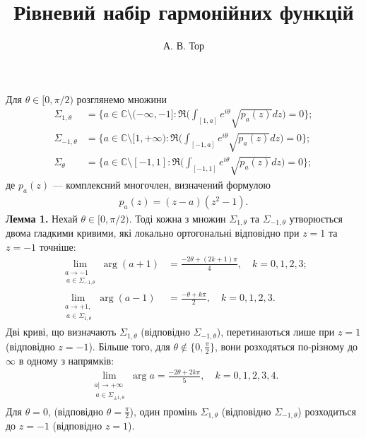 \documentclass{article}
\title{\sffamily Рівневий набір гармонійних функцій}
\author{А. В. Тор}
\date{}
\begin{document}
\maketitle
Для $ \theta \in [0, \pi/2) $ розглянемо множини
\begin{align*}
    \Sigma_{1,\theta} &= \bigg\{ a \in \mathbb{C} \setminus (-\infty,-1] : \Re \bigg( \int_{[1,a]} e^{i\theta} \sqrt{p_a (z)} dz \bigg) = 0 \bigg\};\\
    \Sigma_{-1,\theta} &= \bigg\{ a \in \mathbb{C} \setminus [1,+\infty) : \Re \bigg( \int_{[-1,a]} e^{i\theta} \sqrt{p_a (z)} dz \bigg) = 0 \bigg\};\\
    \Sigma_{\theta} &= \bigg\{ a \in \mathbb{C} \setminus [-1,1] : \Re \bigg( \int_{[-1,1]} e^{i\theta} \sqrt{p_a (z)} dz \bigg) = 0 \bigg\};
\end{align*}
де $ p_a (z) $ — комплексний многочлен, визначений формулою
\begin{align*}
    p_a (z) = (z - a)(z^2 - 1).
\end{align*}
\textbf{Лемма 1.} \textsf{Нехай $ \theta \in [0, \pi/2) $. Тоді кожна з множин $ \Sigma_{1,\theta} $ та $ \Sigma_{-1,\theta} $ утворюється двома гладкими кривими, які локально ортогональні відповідно при $ z = 1 $ та $ z = -1 $ точніше:
\begin{align*}
    \lim_{\substack{a \to -1 \\ \ a \in \Sigma_{-1,\theta}}} \arg (a+1) &= \frac{-2\theta + (2k + 1) \pi}{4}, \quad k = 0,1,2,3; \\
    \lim_{\substack{a \to +1, \\ \ a \in \Sigma_{1,\theta}}} \arg (a-1) &= \frac{-\theta + k\pi}{2}, \quad k = 0,1,2,3.
\end{align*}
Дві криві, що визначають $ \Sigma_{1,\theta} $ (відповідно $ \Sigma_{-1,\theta} $), перетинаються лише при $ z = 1 $ (відповідно $ z = -1 $). Більше того, для $ \theta \notin \{0, \frac{\pi}{2}\} $, вони розходяться по-різному до $\infty$ в одному з напрямків:
\begin{align*}
    \lim_{\substack{a| \to +\infty \\ \ a \in \Sigma_{\pm1,\theta}}} \arg a = \frac{-2\theta + 2k\pi}{5}, \quad k = 0,1,2,3,4.
\end{align*}
Для $ \theta = 0 $, (відповідно $ \theta = \frac{\pi}{2} $), один промінь $ \Sigma_{1,\theta} $ (відповідно $ \Sigma_{-1,\theta} $) розходиться до $ z = -1 $ (відповідно $ z = 1 $).}
\end{document}

